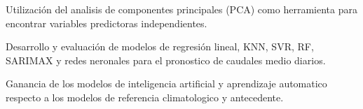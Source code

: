 \documentclass[draft]{agujournal2019}
\begin{document}


 \begin{keypoints}
 \item	Utilización del analisis de componentes principales (PCA) como herramienta para encontrar variables predictoras independientes.
 \item	Desarrollo y evaluación de modelos de regresión lineal, KNN, SVR, RF, SARIMAX y redes neronales para el pronostico de caudales medio diarios. 
 \item	Ganancia de los modelos de inteligencia artificial y aprendizaje automatico respecto a los modelos de referencia climatologico y antecedente.
 \end{keypoints}


%
%

%
%

\end{document}
